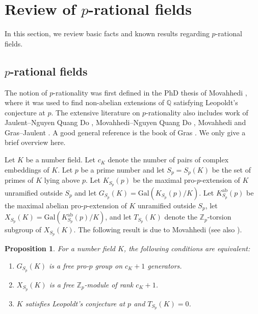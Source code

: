 \documentclass[12pt, a4paper, usenames]{amsart}
\newcommand{\Z}{\mathbb{Z}}
\newcommand{\Q}{\mathbb{Q}}
\theoremstyle{plain}
\newtheorem{prop}[theorem]{Proposition}
\theoremstyle{remark}
\theoremstyle{definition}
\newcommand{\Gal}{\mathrm{Gal}}
\begin{document}
\section{Review of $p$-rational fields}\label{sec:p-rationality}

In this section, we review basic facts and known 
results regarding $p$-rational fields.

\subsection{$p$-rational fields}\label{subsec:p-rational-fields}
The notion of $p$-rationality was first defined in the PhD thesis
of Movahhedi \cite{MovahhediPhD}, where it was used to find non-abelian extensions of 
$\Q$ satisfying Leopoldt's conjecture at $p$. 
The extensive literature on $p$-rationality also includes 
work of Jaulent--Nguyen Quang Do \cite{MR1265910}, Movahhedi--Nguyen Quang Do \cite{MR1042770}, Movahhedi \cite{MR1124802} and Gras--Jaulent \cite{MR1017575}.
A good general reference is the book of Gras
\cite[Chapter~VI, \S 3]{MR1941965}.
We only give a brief overview here.

Let $K$ be a number field. 
Let $c_{K}$ denote the number of pairs of complex embeddings of $K$.
Let $p$ be a prime number and let $S_{p}=S_{p}(K)$ be the set of primes of $K$ 
lying above $p$. 
Let $K_{S_{p}}(p)$ be the maximal pro-$p$-extension of $K$ unramified outside
$S_{p}$ and let $G_{S_{p}}(K)=\Gal(K_{S_{p}}(p)/K)$.
Let $K_{S_{p}}^{\mathrm{ab}}(p)$ be the 
maximal abelian pro-$p$-extension of $K$ unramified outside $S_{p}$, let 
$X_{S_{p}}(K)=\Gal(K_{S_{p}}^{\mathrm{ab}}(p)/K)$, and let 
$T_{S_{p}}(K)$ denote the $\Z_{p}$-torsion subgroup of $X_{S_{p}}(K)$.
The following result is due to Movahhedi \cite[Proposition~1]{MR1124802} (see also \cite[\S 3]{MR3512524}).

\begin{prop}\label{prop:def-char-p-rational}
For a number field $K$, the following conditions are equivalent:
\begin{enumerate}
    \item $G_{S_{p}}(K)$ is a free pro-$p$ group on $c_{K}+1$ generators.
    \item $X_{S_{p}}(K)$ is a free $\Z_{p}$-module of rank $c_{K}+1$.
    \item $K$ satisfies Leopoldt's conjecture at $p$ and $T_{S_{p}}(K)=0$.
\end{enumerate}
\end{prop}
\end{document}
